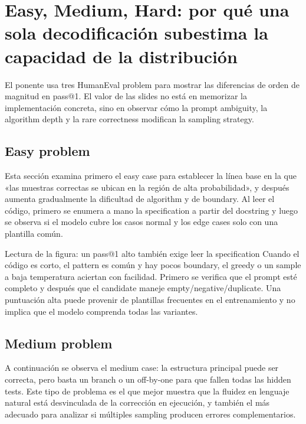 \section{Easy, Medium, Hard: por qué una sola decodificación subestima la capacidad de la distribución}

El ponente usa tres HumanEval problem para mostrar las diferencias de orden de magnitud en pass@1. El valor de las slides no está en memorizar la implementación concreta, sino en observar cómo la prompt ambiguity, la algorithm depth y la rare correctness modifican la sampling strategy.

\subsection{Easy problem}

Esta sección examina primero el easy case para establecer la línea base en la que «las muestras correctas se ubican en la región de alta probabilidad», y después aumenta gradualmente la dificultad de algorithm y de boundary. Al leer el código, primero se enumera a mano la specification a partir del docstring y luego se observa si el modelo cubre los casos normal y los edge cases solo con una plantilla común.


\begin{knowledgebox}{Lectura de la figura: un pass@1 alto también exige leer la specification}
Cuando el código es corto, el pattern es común y hay pocos boundary, el greedy o un sample a baja temperatura aciertan con facilidad. Primero se verifica que el prompt esté completo y después que el candidate maneje empty/negative/duplicate. Una puntuación alta puede provenir de plantillas frecuentes en el entrenamiento y no implica que el modelo comprenda todas las variantes.
\end{knowledgebox}

\subsection{Medium problem}

A continuación se observa el medium case: la estructura principal puede ser correcta, pero basta un branch o un off-by-one para que fallen todas las hidden tests. Este tipo de problema es el que mejor muestra que la fluidez en lenguaje natural está desvinculada de la corrección en ejecución, y también el más adecuado para analizar si múltiples sampling producen errores complementarios.

